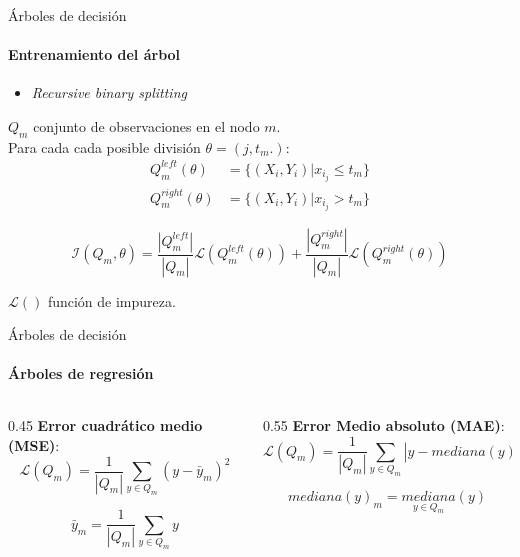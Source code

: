 \documentclass{beamer}
\begin{document}
\begin{frame}{\LARGE Árboles de decisión}
    \framesubtitle{Entrenamiento del árbol}
    \begin{itemize}
        \item \textit{Recursive binary splitting}
    \end{itemize}

    $Q_m$ conjunto de observaciones en el nodo $m$.\\
    Para cada cada posible división $\theta= (j,t_m.):$
    \begin{equation*}
        \begin{split}
            Q^{left}_m(\theta) &= \{ (X_i,Y_i)|x_{i_j} \leq t_m \} \\
            Q^{right}_m(\theta) &= \{ (X_i,Y_i)|x_{i_j} > t_m \}
        \end{split}
    \end{equation*}

    \begin{equation*}
        \mathcal{I}(Q_m,\theta)= \frac{|Q^{left}_m|}{|Q_m|}\mathcal{L}(Q^{left}_m(\theta))+\frac{|Q^{right}_m|}{|Q_m|}\mathcal{L}(Q^{right}_m(\theta))
    \end{equation*}

    $\mathcal{L}()$ función de impureza.
\end{frame}

\begin{frame}{\LARGE Árboles de decisión}
    \framesubtitle{Árboles de regresión}
    \begin{columns}[T]

        \begin{column}{0.45\textwidth}
            \textbf{Error cuadrático medio (MSE)}:
            \begin{equation*}
                \mathcal{L}(Q_m)=\frac{1}{|Q_m|}\sum_{y \in Q_m}(y-\bar{y}_m)^2
            \end{equation*}

            \begin{equation*}
                \bar{y}_m=\frac{1}{|Q_m|}\sum_{y \in Q_m}y
            \end{equation*}

        \end{column}

        \begin{column}{0.55\textwidth}
            \textbf{Error Medio absoluto (MAE)}:
            \begin{equation*}
                \mathcal{L}(Q_m)=\frac{1}{|Q_m|} \sum_{y \in Q_m} |y- mediana(y)_m|
            \end{equation*}

            \begin{equation*}
                mediana(y)_m=\underset{y \in Q_m}{mediana}(y)
            \end{equation*}
        \end{column}
    \end{columns}
\end{frame}
\end{document}
